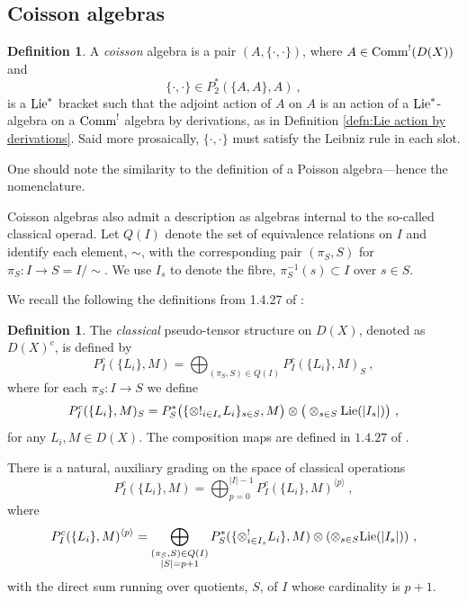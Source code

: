 \documentclass[11pt]{amsart}
\numberwithin{equation}{section}
\theoremstyle{definition}
\newtheorem{defn}[theo]{Definition}
\newcommand{\Comm}{{\textup{Comm}}}
\newcommand{\Lie}{{\textup{Lie}}}
\newcommand{\0}{{\textbf{0}}}
\newcommand{\DD}{{D}}
\begin{document}
\subsection{Coisson algebras}\label{ssec:coisson intro}

\begin{defn}
	A \emph{coisson} algebra is a pair $(A,\{\cdot,\cdot\})$, where $A\in \Comm^!(\DD(X))$ and 
	\[
	\{\cdot,\cdot\}\in P_{2}^*(\{A,A\},A)~,
	\]
	is a $\Lie^*$ bracket such that the adjoint action of $A$ on $A$ is an action of a $\Lie^*$-algebra on a $\Comm^!$ algebra by derivations, as in Definition \ref{defn:Lie action by derivations}. Said more prosaically, $\{\cdot,\cdot\}$ must satisfy the Leibniz rule in each slot.
\end{defn}
One should note the similarity to the definition of a Poisson algebra---hence the nomenclature.


Coisson algebras also admit a description as algebras internal to the so-called classical operad. Let $Q(I)$ denote the set of equivalence relations on $I$ and identify each element, $\sim$, with the corresponding pair $(\pi_S,S)$ for $\pi_S:I\rightarrow S= I/\sim $. We use $I_s$ to denote the fibre, $\pi_S^{-1}(s)\subset I$ over $s\in S$. 

We recall the following the definitions from 1.4.27 of \cite{BD1}:

\begin{defn} The \emph{classical} pseudo-tensor structure on $\DD(X)$, denoted as $\DD(X)^c$, is defined by
	\[ 
	P_I^c(\{ L_i\},M) = \bigoplus_{(\pi_S,S)\in Q(I)}  P_I^c(\{L_i\},M)_S ~,
	\]
	where for each $\pi_S:I\to S$ we define
	\[
	P_I^c(\{L_i\},M)_S= P_S^*\big(\{ \otimes!_{i\in I_s} L_i\}_{s\in S},M\big)\otimes \big( \otimes_{s\in S} \Lie(|I_s|)\big)~,
	\]
	for any $L_i,M\in \DD(X)$. The composition maps are defined in $1.4.27$ of \cite{BD1}.
\end{defn}

There is a natural, auxiliary grading on the space of classical operations
\[
	P_I^c(\{ L_i\},M) = \bigoplus_{p=0}^{|I|-1}  P_I^c(\{ L_i\},M)^{\langle p \rangle} ~,
\]
where
\begin{equation}\label{auxgreqn}
	P_I^c(\{ L_i\},M)^{\langle p \rangle}=\bigoplus_{\substack{(\pi_S,S)\in Q(I)\\ |S|=p+1}} P_S^*(\{ \otimes^!_{i\in I_s} L_i\},M)\otimes ( \otimes_{s\in S} \Lie(|I_s|))   \ ,  
\end{equation}
with the direct sum running over quotients, $S$, of $I$ whose cardinality is $p+1$.
\end{document}
